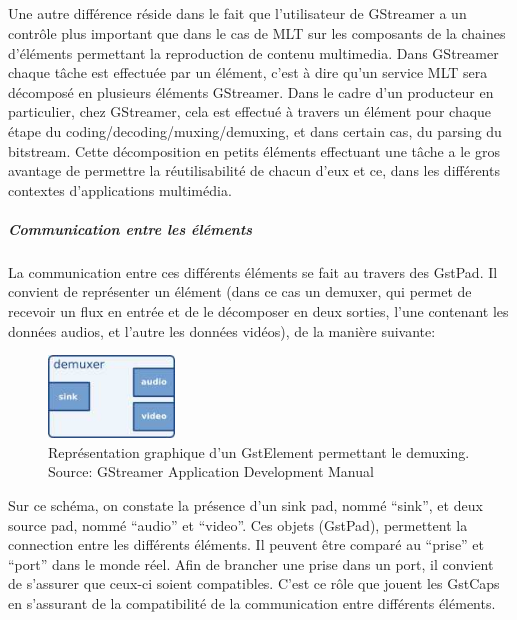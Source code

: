 \subparagraph{}

Une autre différence réside dans le fait que l'utilisateur de GStreamer
a un contrôle plus important que dans le cas de MLT sur
les composants de la chaines d'éléments permettant la reproduction de
contenu multimedia.  Dans GStreamer chaque tâche est effectuée par un
élément, c'est à dire qu'un service MLT sera décomposé
en plusieurs éléments GStreamer. Dans le cadre d'un producteur en
particulier, chez GStreamer, cela est effectué à travers un élément
pour chaque étape du coding/decoding/muxing/demuxing, et dans certain
cas, du parsing du bitstream. Cette décomposition en petits éléments
effectuant une tâche a le gros avantage de permettre la réutilisabilité
de chacun d'eux et ce, dans les différents  contextes d'applications
multimédia.

\subparagraph{Communication entre les éléments}

\subparagraph{}

La communication entre ces différents éléments se fait au travers des
GstPad. Il convient de représenter un élément (dans ce cas un demuxer,
qui permet de recevoir un flux en entrée et de le décomposer en deux
sorties, l'une contenant les données audios, et l'autre les données
vidéos), de la manière suivante:

\begin{figure} [H]

  \begin{center}

    \includegraphics[width=0.30\textwidth]{images/gstdemuxer}

  \end{center}

  \caption{Représentation graphique d'un GstElement permettant le
  demuxing. Source: GStreamer Application Development Manual}

  \label{Yes}

\end{figure}

Sur ce schéma, on constate la présence d'un sink pad, nommé ``sink'',
et deux source pad, nommé ``audio'' et ``video''. Ces objets (GstPad),
permettent la connection entre les différents éléments. Il peuvent
être comparé au ``prise'' et ``port'' dans le monde réel.  Afin de
brancher une prise dans un port, il convient de s'assurer que ceux-ci
soient compatibles. C'est ce rôle que jouent les GstCaps en s'assurant
de la compatibilité de la communication entre différents éléments.

